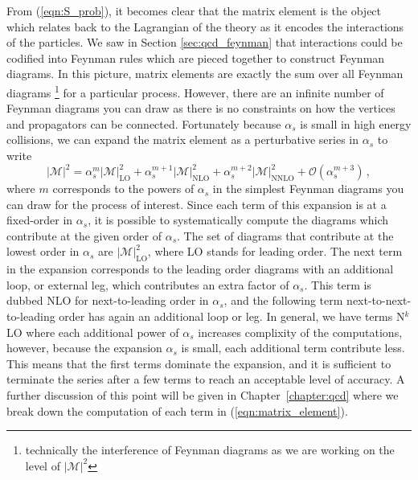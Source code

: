 \documentclass[main.tex]{subfiles}
\begin{document}
    From (\ref{eqn:S_prob}), it becomes clear
    that the matrix element is the object which
    relates back to the Lagrangian of the theory
    as it encodes the interactions of the particles.
    We saw in Section \ref{sec:qcd_feynman} that
    interactions could be codified into Feynman
    rules which are pieced together to construct
    Feynman diagrams. In this picture, matrix elements
    are exactly the sum over all Feynman diagrams
    \footnote{technically the interference of
    Feynman diagrams as we are working on the level
    of $|\mathcal{M}|^{2}$}
    for a particular process. However, there are
    an infinite number of Feynman diagrams you can
    draw as there is no constraints on how the
    vertices and propagators can be connected.
    Fortunately because $\alpha_{s}$
    is small in high energy collisions, we can expand
    the matrix element as a perturbative series in
    $\alpha_{s}$ to write
    \begin{equation}\label{eqn:matrix_element}
        |\mathcal{M}|^{2} =  \alpha_{s}^{m} |\mathcal{M}|^{2}_{\mathrm{LO}} + \alpha_{s}^{m+1} |\mathcal{M}|^{2}_{\mathrm{NLO}} + \alpha_{s}^{m+2} |\mathcal{M}|^{2}_{\mathrm{NNLO}} + \mathcal{O}(\alpha_{s}^{m+3}) \, ,
    \end{equation}
    where $m$ corresponds to the powers of $\alpha_{s}$
    in the simplest Feynman diagrams you can draw
    for the process of interest.
    Since each term of this expansion is at a fixed-order
    in $\alpha_{s}$, it is possible to systematically
    compute the diagrams which contribute at the given order of $\alpha_{s}$.
    The set of diagrams that contribute at the lowest
    order in $\alpha_{s}$ are $|\mathcal{M}|^{2}_{\mathrm{LO}}$,
    where LO stands for leading order. The next term
    in the expansion corresponds to the leading order
    diagrams with an additional loop, or external leg,
    which contributes an extra factor of $\alpha_{s}$.
    This term is dubbed NLO for next-to-leading order
    in $\alpha_{s}$, and the following term
    next-to-next-to-leading order has again an additional
    loop or leg. In general, we have terms
    N$^{k}$LO where each additional power of $\alpha_{s}$
    increases complixity of the computations, however,
    because the expansion $\alpha_{s}$
    is small, each additional term contribute less.
    This means that the first terms dominate the expansion,
    and it is sufficient to terminate the series after
    a few terms to reach an acceptable level of accuracy.
    A further discussion of this point will be given
    in Chapter~\ref{chapter:qcd} where we break down
    the computation of each term in (\ref{eqn:matrix_element}).
\end{document}
